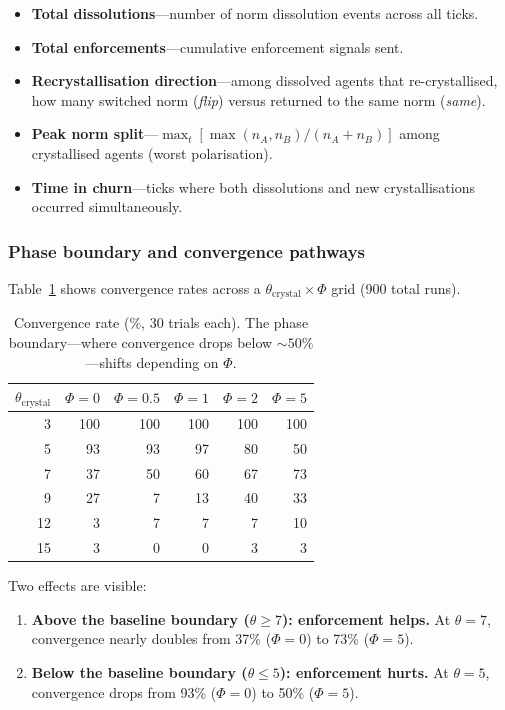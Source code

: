 \documentclass[11pt,a4paper]{article}
\begin{document}
\begin{itemize}[nosep]
\item \textbf{Total dissolutions}---number of norm dissolution events across all ticks.
\item \textbf{Total enforcements}---cumulative enforcement signals sent.
\item \textbf{Recrystallisation direction}---among dissolved agents that re-crystallised, how many switched norm (\emph{flip}) versus returned to the same norm (\emph{same}).
\item \textbf{Peak norm split}---$\max_t [\max(n_A, n_B) / (n_A + n_B)]$ among crystallised agents (worst polarisation).
\item \textbf{Time in churn}---ticks where both dissolutions and new crystallisations occurred simultaneously.
\end{itemize}

\subsubsection{Phase boundary and convergence pathways}
\label{sec:boundary}

Table~\ref{tab:phase_boundary} shows convergence rates across a $\theta_{\mathrm{crystal}} \times \Phi$ grid (900 total runs).

\begin{table}[H]
\centering
\caption{Convergence rate (\%, 30 trials each). The phase boundary---where convergence drops below ${\sim}50\%$---shifts depending on $\Phi$.}
\label{tab:phase_boundary}
\begin{tabular}{@{}r rrrrr@{}}
\toprule
$\theta_{\mathrm{crystal}}$ & $\Phi{=}0$ & $\Phi{=}0.5$ & $\Phi{=}1$ & $\Phi{=}2$ & $\Phi{=}5$ \\
\midrule
3  & 100 & 100 & 100 & 100 & 100 \\
5  & 93  & 93  & 97  & 80  & 50 \\
7  & 37  & 50  & 60  & 67  & 73 \\
9  & 27  & 7   & 13  & 40  & 33 \\
12 & 3   & 7   & 7   & 7   & 10 \\
15 & 3   & 0   & 0   & 3   & 3 \\
\bottomrule
\end{tabular}
\end{table}

Two effects are visible:

\begin{enumerate}
\item \textbf{Above the baseline boundary ($\theta \geq 7$): enforcement helps.} At $\theta = 7$, convergence nearly doubles from 37\% ($\Phi = 0$) to 73\% ($\Phi = 5$).

\item \textbf{Below the baseline boundary ($\theta \leq 5$): enforcement hurts.} At $\theta = 5$, convergence drops from 93\% ($\Phi = 0$) to 50\% ($\Phi = 5$).
\end{enumerate}
\end{document}
